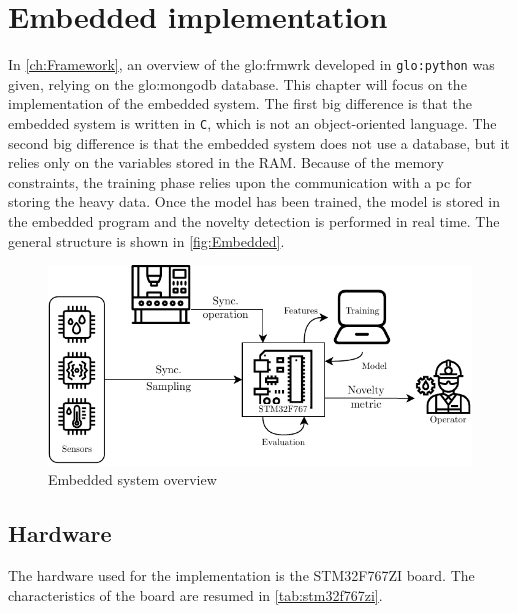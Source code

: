 \chapter{Embedded implementation}
\label{ch:Embedded}
In \autoref{ch:Framework}, an overview of the \gls{glo:frmwrk} developed in \texttt{\gls{glo:python}} was given, relying on the \gls{glo:mongodb} database. This chapter will focus on the implementation of the embedded system. The first big difference is that the embedded system is written in \texttt{C}, which is not an object-oriented language. The second big difference is that the embedded system does not use a database, but it relies only on the variables stored in the RAM. Because of the memory constraints, the training phase relies upon the communication with a \gls{pc} for storing the heavy data. Once the model has been trained, the model is stored in the embedded program and the novelty detection is performed in real time. The general structure is shown in \autoref{fig:Embedded}.

\begin{figure}
    \centering
    \includegraphics[scale=1]{images/Embedded/EmbeddedStructure.pdf}
    \caption{Embedded system overview}
    \label{fig:Embedded}
\end{figure}


\section{Hardware}
The hardware used for the implementation is the STM32F767ZI board. The characteristics of the board are resumed in \autoref{tab:stm32f767zi}.


